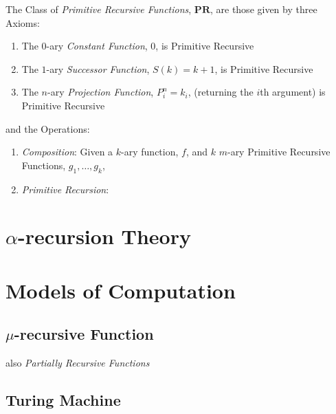 \documentclass{article}
\begin{document}
The Class of \emph{Primitive Recursive Functions}, $\mathbf{PR}$, are
those given by three Axioms:
\begin{enumerate}
    \item The $0$-ary \emph{Constant Function}, $0$, is Primitive
      Recursive
    \item The $1$-ary \emph{Successor Function}, $S(k) = k + 1$, is
      Primitive Recursive
    \item The $n$-ary \emph{Projection Function}, $P_i^n = k_i$,
      (returning the $i$th argument) is Primitive Recursive
\end{enumerate}
and the Operations:
\begin{enumerate}
    \item \emph{Composition}: Given a $k$-ary function, $f$, and $k$
      $m$-ary Primitive Recursive Functions, $g_1, \ldots, g_k$, %
    \item \emph{Primitive Recursion}:
\end{enumerate}

\section{$\alpha$-recursion Theory}\label{sec:alpha_recursion}

\section{Models of Computation}\label{sec:computation_model}

\subsection{$\mu$-recursive Function}\label{subsec:mu_recursive}

also \emph{Partially Recursive Functions}

\subsection{Turing Machine}
\end{document}
